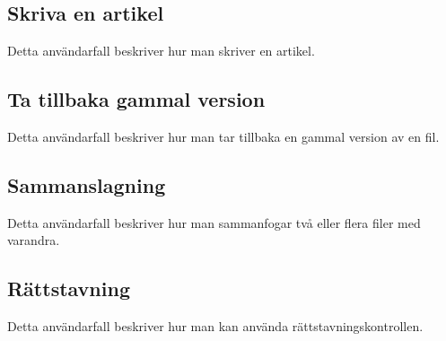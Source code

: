 \subsection{Skriva en artikel}
Detta användarfall beskriver hur man skriver en artikel.
\subsection{Ta tillbaka gammal version}
Detta användarfall beskriver hur man tar tillbaka en gammal version av en fil.
\subsection{Sammanslagning}
Detta användarfall beskriver hur man sammanfogar två eller flera filer med varandra.
\subsection{Rättstavning}
Detta användarfall beskriver hur man kan använda rättstavningskontrollen.

